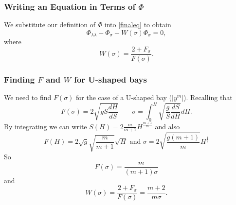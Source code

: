 	\begin{frame}
		\frametitle{Writing an Equation in Terms of $\Phi$}
		We substitute our definition of $\Phi$ into \eqref{finaleq} to obtain
		\begin{equation}\label{Phieq}
			\Phi_{\lambda \lambda} - \Phi_{\sigma} - W(\sigma) \Phi_\sigma = 0,
		\end{equation}
		where
		\[
			W(\sigma) = \frac{2 + F_\sigma}{F(\sigma)}.
		\]
	\end{frame}


	\begin{frame}
		\frametitle{Finding $F$ and $W$ for U-shaped bays}
		We need to find $F(\sigma)$ for the case of a U-shaped bay ($|y^m|$). Recalling that
		\[
			F(\sigma)= 2 \sqrt{gS \frac{dH}{dS}} \qquad \sigma = \int_0^H \sqrt{\frac{g}{S} \frac{dS}{dH}}dH.
		\]
		By integrating we can write $S(H)=2\frac{m}{m+1}H^{\frac{m+1}{m}}$ and also
		\[
			F(H)=2\sqrt{g} \sqrt{\frac{m}{m+1}} \sqrt{H} \text{ and } \sigma=2\sqrt{\frac{g(m+1)}{m}} H^{\frac12}
		\]
		So
			\[ F(\sigma)=\frac{m}{(m+1)\sigma} \]
		and
			\[ W(\sigma) = \frac{2 + F_\sigma}{F(\sigma)}=\frac{m+2}{m\sigma}. \]
	
	\end{frame}

